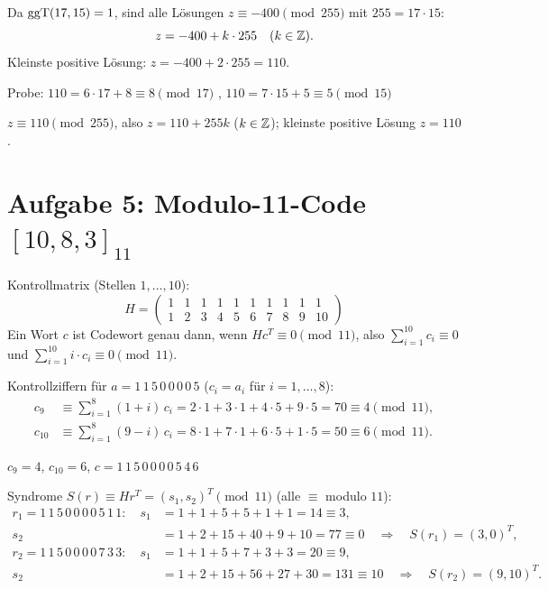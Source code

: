 Da $\operatorname{ggT}(17, 15) = 1$, sind alle Lösungen $z \equiv -400 \pmod{255}$ mit $255 = 17 \cdot 15$:
\[
z = -400 + k \cdot 255 \quad (k \in \mathbb{Z}).
\]
Kleinste positive Lösung: $z = -400 + 2 \cdot 255 = 110$.

Probe: $110 = 6 \cdot 17 + 8 \equiv 8 \pmod{17}$ \checkmark, \quad $110 = 7 \cdot 15 + 5 \equiv 5 \pmod{15}$ \checkmark
\begin{ergebnis} $z \equiv 110 \pmod{255}$, also $z = 110 + 255k$ ($k \in \mathbb{Z}$); kleinste positive Lösung $z = 110$. \end{ergebnis}

\section*{Aufgabe 5: Modulo-11-Code $[10, 8, 3]_{11}$}
 Kontrollmatrix (Stellen $1, \dots, 10$):
\[
H = \begin{pmatrix}
1 & 1 & 1 & 1 & 1 & 1 & 1 & 1 & 1 & 1\\
1 & 2 & 3 & 4 & 5 & 6 & 7 & 8 & 9 & 10
\end{pmatrix}
\]
Ein Wort $c$ ist Codewort genau dann, wenn $H c^T \equiv 0 \pmod{11}$, also
$\sum_{i=1}^{10} c_i \equiv 0$ und $\sum_{i=1}^{10} i \cdot c_i \equiv 0 \pmod{11}$.

 Kontrollziffern für $a = 1\,1\,5\,0\,0\,0\,0\,5$ ($c_i = a_i$ für $i = 1, \dots, 8$):
\begin{align*}
c_9 &\equiv \sum_{i=1}^{8} (1+i)\, c_i = 2 \cdot 1 + 3 \cdot 1 + 4 \cdot 5 + 9 \cdot 5 = 70 \equiv 4 \pmod{11},\\
c_{10} &\equiv \sum_{i=1}^{8} (9-i)\, c_i = 8 \cdot 1 + 7 \cdot 1 + 6 \cdot 5 + 1 \cdot 5 = 50 \equiv 6 \pmod{11}.
\end{align*}
\begin{ergebnis} $c_9 = 4$, $c_{10} = 6$, $c = 1\,1\,5\,0\,0\,0\,0\,5\,4\,6$ \end{ergebnis}

 Syndrome $S(r) \equiv H r^T = (s_1, s_2)^T \pmod{11}$ (alle $\equiv$ modulo $11$):
\begin{align*}
r_1 = 1\,1\,5\,0\,0\,0\,0\,5\,1\,1:\quad
s_1 &= 1 + 1 + 5 + 5 + 1 + 1 = 14 \equiv 3,\\
s_2 &= 1 + 2 + 15 + 40 + 9 + 10 = 77 \equiv 0 \quad\Rightarrow\quad S(r_1) = (3, 0)^T,\\[4pt]
r_2 = 1\,1\,5\,0\,0\,0\,0\,7\,3\,3:\quad
s_1 &= 1 + 1 + 5 + 7 + 3 + 3 = 20 \equiv 9,\\
s_2 &= 1 + 2 + 15 + 56 + 27 + 30 = 131 \equiv 10 \quad\Rightarrow\quad S(r_2) = (9, 10)^T .
\end{align*}

